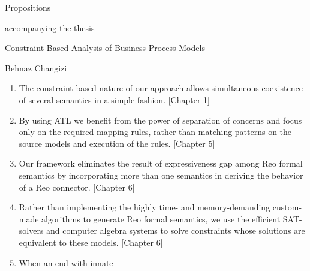 \begin{center}{\large{Propositions}}\end{center}
\begin{center}accompanying the thesis\end{center}

\vspace*{.5cm}
\begin{center}{\Large{Constraint-Based Analysis of Business Process Models}}\end{center}

\begin{center}Behnaz Changizi\end{center}
\vspace*{1cm}
\begin{enumerate}
\item The constraint-based nature of our approach
allows simultaneous coexistence of several semantics in a simple fashion. [Chapter 1]
\item By using ATL we benefit from the power of separation of concerns and focus
only on the required mapping rules, rather than matching patterns on the source
models and execution of the rules. [Chapter 5]
\item Our framework eliminates the result of expressiveness gap among Reo formal
semantics by incorporating more than one semantics in deriving the behavior
of a Reo connector. [Chapter 6]
\item Rather than implementing the highly time- and memory-demanding
custom-made algorithms to generate Reo formal semantics, we use the efficient
SAT-solvers and computer algebra systems to solve constraints whose solutions
are equivalent to these models. [Chapter 6]
\item When an end with innate

\end{enumerate}
